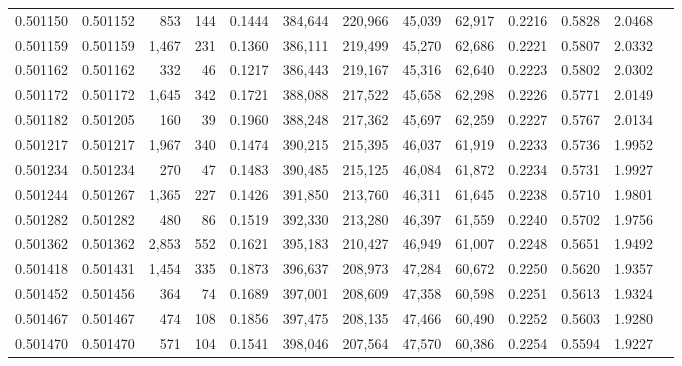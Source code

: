 \begin{tabular}{rrrrrrrrrrrrr}
0.501150 & 0.501152 &   853 &   144 &                                     0.1444 & 384,644 & 220,966 &  45,039 &  62,917 & 0.2216 & 0.5828 & 2.0468 \\
0.501159 & 0.501159 & 1,467 &   231 &                                     0.1360 & 386,111 & 219,499 &  45,270 &  62,686 & 0.2221 & 0.5807 & 2.0332 \\
0.501162 & 0.501162 &   332 &    46 &                                     0.1217 & 386,443 & 219,167 &  45,316 &  62,640 & 0.2223 & 0.5802 & 2.0302 \\
0.501172 & 0.501172 & 1,645 &   342 &                                     0.1721 & 388,088 & 217,522 &  45,658 &  62,298 & 0.2226 & 0.5771 & 2.0149 \\
0.501182 & 0.501205 &   160 &    39 &                                     0.1960 & 388,248 & 217,362 &  45,697 &  62,259 & 0.2227 & 0.5767 & 2.0134 \\
0.501217 & 0.501217 & 1,967 &   340 &                                     0.1474 & 390,215 & 215,395 &  46,037 &  61,919 & 0.2233 & 0.5736 & 1.9952 \\
0.501234 & 0.501234 &   270 &    47 &                                     0.1483 & 390,485 & 215,125 &  46,084 &  61,872 & 0.2234 & 0.5731 & 1.9927 \\
0.501244 & 0.501267 & 1,365 &   227 &                                     0.1426 & 391,850 & 213,760 &  46,311 &  61,645 & 0.2238 & 0.5710 & 1.9801 \\
0.501282 & 0.501282 &   480 &    86 &                                     0.1519 & 392,330 & 213,280 &  46,397 &  61,559 & 0.2240 & 0.5702 & 1.9756 \\
0.501362 & 0.501362 & 2,853 &   552 &                                     0.1621 & 395,183 & 210,427 &  46,949 &  61,007 & 0.2248 & 0.5651 & 1.9492 \\
0.501418 & 0.501431 & 1,454 &   335 &                                     0.1873 & 396,637 & 208,973 &  47,284 &  60,672 & 0.2250 & 0.5620 & 1.9357 \\
0.501452 & 0.501456 &   364 &    74 &                                     0.1689 & 397,001 & 208,609 &  47,358 &  60,598 & 0.2251 & 0.5613 & 1.9324 \\
0.501467 & 0.501467 &   474 &   108 &                                     0.1856 & 397,475 & 208,135 &  47,466 &  60,490 & 0.2252 & 0.5603 & 1.9280 \\
0.501470 & 0.501470 &   571 &   104 &                                     0.1541 & 398,046 & 207,564 &  47,570 &  60,386 & 0.2254 & 0.5594 & 1.9227 \\

\end{tabular}
